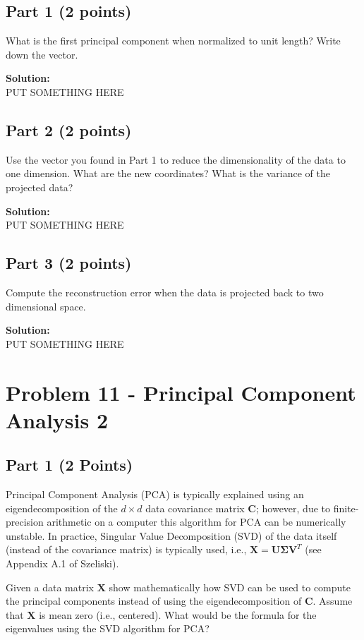 \documentclass[11pt, oneside]{article}   	%
\begin{document}
\subsection*{Part 1 (2 points)}
What is the first principal component when normalized to unit length? Write down the vector.

\textbf{Solution:}\\
PUT SOMETHING HERE 

\subsection*{Part 2 (2 points)}
Use the vector you found in Part 1 to reduce the dimensionality of the data to one dimension. What are the new coordinates? What is the variance of the projected data?

\textbf{Solution:}\\
PUT SOMETHING HERE 

\subsection*{Part 3 (2 points)}
Compute the reconstruction error when the data is projected back to two dimensional space.

\textbf{Solution:}\\
PUT SOMETHING HERE 

\section*{Problem 11 - Principal Component Analysis 2}

\subsection*{Part 1 (2 Points)}
Principal Component Analysis (PCA) is typically explained using an eigendecomposition of the $d \times d$ data covariance matrix $\mathbf{C}$; however, due to finite-precision arithmetic on a computer this algorithm for PCA can be numerically unstable. In practice, Singular Value Decomposition (SVD) of the data itself (instead of the covariance matrix) is typically used, i.e., ${\mathbf{X}} = {\mathbf{U\Sigma V}}^T$ (see Appendix A.1 of Szeliski).

Given a data matrix $\mathbf{X}$ show mathematically how SVD can be used to compute the principal components instead of using the eigendecomposition of $\mathbf{C}$. Assume that ${\mathbf{X}}$ is mean zero (i.e., centered).  What would be the formula for the eigenvalues using the SVD algorithm for PCA? 
\end{document}
